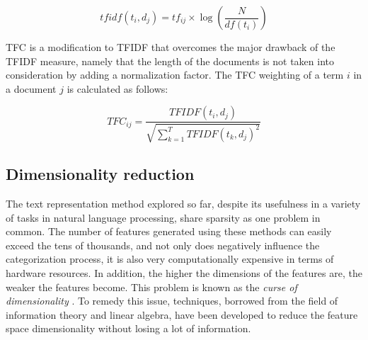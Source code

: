 $$t f i d f \left( t _ { i } , d _ { j } \right) = t f _ { i j } \times \log \left( \frac { N } { d f \left( t _ { i } \right) } \right)$$


TFC is a modification to TFIDF that overcomes the major drawback of the
TFIDF measure, namely that the length of the documents is not taken into
consideration by adding a normalization factor. The TFC weighting of a
term $i$ in a document $j$ is calculated as follows:

$$T F C _ { i j } = \frac { T F I D F \left( t _ { i } , d _ { j } \right) } { \sqrt { \sum _ { k = 1 } ^ { T } T F I D F \left( t _ { k } , d _ { j } \right) ^ { 2 } } }$$

\subsection{Dimensionality reduction}

The text representation method explored so far, despite its usefulness in a variety of tasks in natural language processing, share sparsity as one problem in common. The number of features generated using these methods can easily exceed the tens of thousands, and not only does negatively influence the categorization process, it is also very computationally expensive in terms of hardware resources. In addition, the higher the dimensions of the features are, the weaker the features become. This problem is known as the \emph{curse of dimensionality} \citep{bellman2015adaptive}. To remedy this issue,  techniques, borrowed from the field of information theory and linear algebra, have been developed to reduce the feature space dimensionality without losing a lot of information. 


